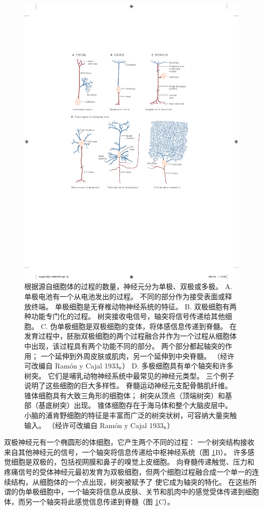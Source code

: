 \begin{figure}[htbp]
	\centering
	\includegraphics[width=0.9\linewidth]{chap03/fig_3_3}
	\caption{根据源自细胞体的过程的数量，神经元分为单极、双极或多极。 
		A. 单极电池有一个从电池发出的过程。 
		不同的部分作为接受表面或释放终端。 
		单极细胞是无脊椎动物神经系统的特征。 
		B. 双极细胞有两种功能专门化的过程。 
		树突接收电信号，轴突将信号传递给其他细胞。 
		C. 伪单极细胞是双极细胞的变体，将体感信息传递到脊髓。 
		在发育过程中，胚胎双极细胞的两个过程融合并作为一个过程从细胞体中出现，该过程具有两个功能不同的部分。 
		两个部分都起轴突的作用； 一个延伸到外周皮肤或肌肉，另一个延伸到中央脊髓。 （经许可改编自 Ramón y Cajal 1933。） 
		D. 多极细胞具有单个轴突和许多树突。 
		它们是哺乳动物神经系统中最常见的神经元类型。 
		三个例子说明了这些细胞的巨大多样性。 
		脊髓运动神经元支配骨骼肌纤维。 锥体细胞具有大致三角形的细胞体； 树突从顶点（顶端树突）和基部（基底树突）出现。 
		锥体细胞存在于海马体和整个大脑皮层中。 
		小脑的浦肯野细胞的特征是丰富而广泛的树突状树，可容纳大量突触输入。 （经许可改编自 Ramón y Cajal 1933。）}
	\label{fig:3_3}
\end{figure}


双极神经元有一个椭圆形的体细胞，它产生两个不同的过程：
一个树突结构接收来自其他神经元的信号，一个轴突将信息传递给中枢神经系统（图 \ref{fig:3_3}B）。 
许多感觉细胞是双极的，包括视网膜和鼻子的嗅觉上皮细胞。 
向脊髓传递触觉、压力和疼痛信号的受体神经元最初发育为双极细胞，但两个细胞过程融合成一个单一的连续结构，从细胞体的一个点出现，树突被赋予了 使它成为轴突的特化。 
在这些所谓的伪单极细胞中，一个轴突将信息从皮肤、关节和肌肉中的感觉受体传递到细胞体，而另一个轴突将此感觉信息传递到脊髓（图 \ref{fig:3_3}C）。


